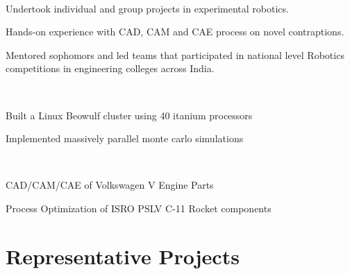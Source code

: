 \documentclass[]{deedy-resume-openfont}
\begin{document}
\begin{minipage}[t]{0.66\textwidth}
\\
\begin{tightemize}
\item Undertook individual and group projects in experimental robotics.
\item Hands-on experience with CAD, CAM and CAE process on novel contraptions.
\item Mentored sophomors and led teams that participated in national level Robotics competitions in engineering colleges across India.
\end{tightemize}
\sectionsep


\\
\begin{tightemize}
	\item Built a Linux Beowulf cluster using 40 itanium processors
  	\item Implemented massively parallel monte carlo simulations
\end{tightemize}
\sectionsep


\\
\begin{tightemize}\item CAD/CAM/CAE of Volkswagen V Engine Parts
\item Process Optimization of ISRO PSLV C-11 Rocket components
\end{tightemize}
\sectionsep



\newcommand\Topstrut{\rule{0pt}{2.1ex}}
\newcommand\Bottomstrut{\rule[-0.6ex]{0pt}{0pt}}

\section{Representative Projects}
\begin{tabular}{rll}


\end{tabular}
\end{minipage}
\end{document}
